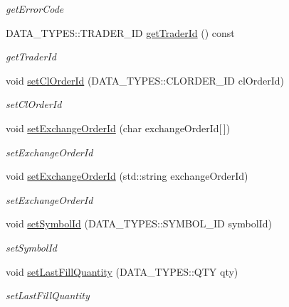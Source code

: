 \begin{DoxyCompactItemize}
\begin{DoxyCompactList}\small\item\em get\-Error\-Code \end{DoxyCompactList}\item 
D\-A\-T\-A\-\_\-\-T\-Y\-P\-E\-S\-::\-T\-R\-A\-D\-E\-R\-\_\-\-I\-D \hyperlink{class_a_p_i2_1_1_order_confirmation_a4f2027253fd1322358ecf3a11f9c492b}{get\-Trader\-Id} () const 
\begin{DoxyCompactList}\small\item\em get\-Trader\-Id \end{DoxyCompactList}\item 
void \hyperlink{class_a_p_i2_1_1_order_confirmation_a7ad42f541a28d3d09ce63fb8600ca9c7}{set\-Cl\-Order\-Id} (D\-A\-T\-A\-\_\-\-T\-Y\-P\-E\-S\-::\-C\-L\-O\-R\-D\-E\-R\-\_\-\-I\-D cl\-Order\-Id)
\begin{DoxyCompactList}\small\item\em set\-Cl\-Order\-Id \end{DoxyCompactList}\item 
void \hyperlink{class_a_p_i2_1_1_order_confirmation_ac53d93c019ae49913ebd9e0c199721c0}{set\-Exchange\-Order\-Id} (char exchange\-Order\-Id\mbox{[}$\,$\mbox{]})
\begin{DoxyCompactList}\small\item\em set\-Exchange\-Order\-Id \end{DoxyCompactList}\item 
void \hyperlink{class_a_p_i2_1_1_order_confirmation_ae5e62817cdc0a80f0fe205d912135126}{set\-Exchange\-Order\-Id} (std\-::string exchange\-Order\-Id)
\begin{DoxyCompactList}\small\item\em set\-Exchange\-Order\-Id \end{DoxyCompactList}\item 
void \hyperlink{class_a_p_i2_1_1_order_confirmation_aaff6a5823a933417bb4de245e48f12e2}{set\-Symbol\-Id} (D\-A\-T\-A\-\_\-\-T\-Y\-P\-E\-S\-::\-S\-Y\-M\-B\-O\-L\-\_\-\-I\-D symbol\-Id)
\begin{DoxyCompactList}\small\item\em set\-Symbol\-Id \end{DoxyCompactList}\item 
void \hyperlink{class_a_p_i2_1_1_order_confirmation_a6adc28f68e6fdd7148b259b3ec6838fd}{set\-Last\-Fill\-Quantity} (D\-A\-T\-A\-\_\-\-T\-Y\-P\-E\-S\-::\-Q\-T\-Y qty)
\begin{DoxyCompactList}\small\item\em set\-Last\-Fill\-Quantity \end{DoxyCompactList}\item 

\end{DoxyCompactItemize}
